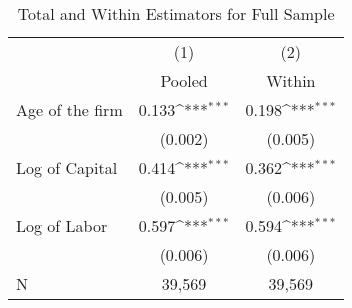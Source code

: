 \begin{table}[htbp]\centering
\def\sym#1{\ifmmode^{#1}\else\(^{#1}\)\fi}
\caption{Total and Within Estimators for Full Sample \label{tab:q4a}}
\begin{tabular}{l*{2}{c}}
\toprule
                    &\multicolumn{1}{c}{(1)}&\multicolumn{1}{c}{(2)}\\
                    &\multicolumn{1}{c}{Pooled}&\multicolumn{1}{c}{Within}\\
\midrule
Age of the firm     &       0.133\sym{***}&       0.198\sym{***}\\
                    &     (0.002)         &     (0.005)         \\
\addlinespace
Log of Capital      &       0.414\sym{***}&       0.362\sym{***}\\
                    &     (0.005)         &     (0.006)         \\
\addlinespace
Log of Labor        &       0.597\sym{***}&       0.594\sym{***}\\
                    &     (0.006)         &     (0.006)         \\
\midrule
N                   &      39,569         &      39,569         \\
\bottomrule
\end{tabular}
\end{table}
